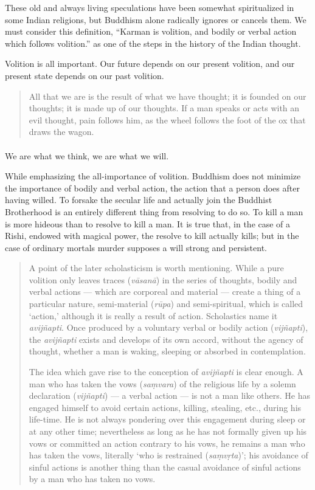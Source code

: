 \documentclass[a4paper, 11pt, oneside, english, landscape]{article}
\begin{document}
These old and always living speculations have been somewhat spiritualized in some Indian religions, but Buddhism alone radically ignores or cancels them. We must consider this definition, ``Karman is volition, and bodily or verbal action which follows volition.'' as one of the steps in the history of the Indian thought.

Volition is all important. Our future depends on our present volition, and our present state depends on our past volition.
\begin{quotation}
\small
All that we are is the result of what we have thought; it is founded on our thoughts; it is made up of our thoughts. If a man speaks or acts with an evil thought, pain follows him, as the wheel follows the foot of the ox that draws the wagon.
\end{quotation}
\paragraph{}
We are what we think, we are what we will.

While emphasizing the all-importance of volition. Buddhism does not minimize the importance of bodily and verbal action, the action that a person does after having willed. To forsake the secular life and actually join the Buddhist Brotherhood is an entirely different thing from resolving to do so. To kill a man is more hideous than to resolve to kill a man. It is true that, in the case of a Rishi, endowed with magical power, the resolve to kill actually kills; but in the case of ordinary mortals murder supposes a will strong and persistent.
\begin{quotation}
\small
A point of the later scholasticism is worth mentioning. While a pure volition only leaves traces (\emph{vāsanā}) in the series of thoughts, bodily and verbal actions --- which are corporeal and material --- create a thing of a particular nature, semi-material (\emph{rūpa}) and semi-spiritual, which is called `action,' although it is really a result of action. Scholastics name it \emph{avijñapti}. Once produced by a voluntary verbal or bodily action (\emph{vijñapti}), the \emph{avijñapti} exists and develops of its own accord, without the agency of thought, whether a man is waking, sleeping or absorbed in contemplation.

The idea which gave rise to the conception of \emph{avijñapti} is clear enough. A man who has taken the vows (\emph{saṃvara}) of the religious life by a solemn declaration (\emph{vijñapti}) --- a verbal action --- is not a man like others. He has engaged himself to avoid certain actions, killing, stealing, etc., during his life-time. He is not always pondering over this engagement during sleep or at any other time; nevertheless as long as he has not formally given up his vows or committed an action contrary to his vows, he remains a man who has taken the vows, literally `who is restrained (\emph{saṃvṛta})'; his avoidance of sinful actions is another thing than the casual avoidance of sinful actions by a man who has taken no vows.
\end{quotation}
\end{document}

